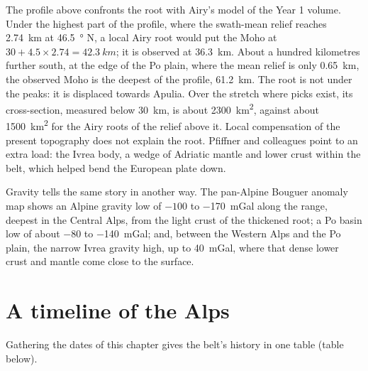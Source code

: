 The profile above confronts the root with Airy's model of the Year 1
volume. Under the highest part of the profile, where the swath-mean relief reaches
\qty{2.74}{km} at \qty{46.5}{\degree} N, a local Airy root would put the Moho at
$30 + 4.5 \times 2.74 = \qty{42.3}{km}$; it is observed at \qty{36.3}{km}. About a hundred
kilometres further south, at the edge of the Po plain, where the mean relief is only
\qty{0.65}{km}, the observed Moho is the deepest of the profile, \qty{61.2}{km}. The root is not under the peaks: it is
displaced towards Apulia. Over the stretch where picks exist, its cross-section, measured
below \qty{30}{km}, is about \qty{2300}{km^2}, against about \qty{1500}{km^2} for the Airy
roots of the relief above it. Local compensation of the present topography does not
explain the root. Pfiffner and colleagues point to an extra load: the Ivrea body, a wedge of
Adriatic mantle and lower crust within the belt, which helped bend the European plate
down.

Gravity tells the same story in another way. The pan-Alpine Bouguer anomaly map shows an
Alpine gravity low of $-100$ to \qty{-170}{mGal} along the range, deepest in the Central
Alps, from the light crust of the thickened root; a Po basin low of about $-80$ to
\qty{-140}{mGal}; and, between the Western Alps and the Po plain, the narrow Ivrea gravity
high, up to \qty{+40}{mGal}, where that dense lower crust and mantle come close to the
surface.

\section{A timeline of the Alps}\label{sec:b2:alpine-orogen:timeline}

Gathering the dates of this chapter gives the belt's history in one table
(table below).

